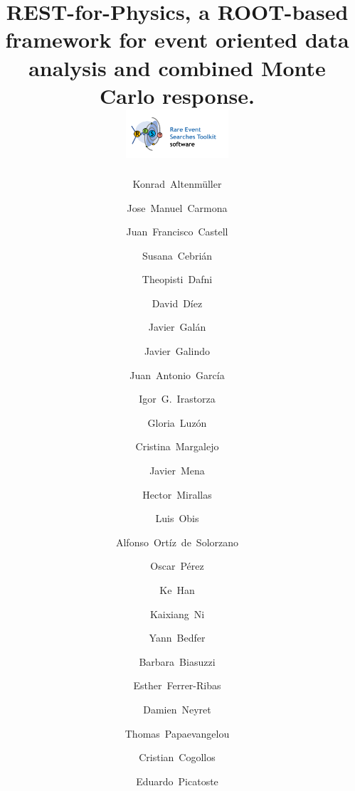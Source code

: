 \documentclass[article]{elsarticle}
\begin{document}
\begin{frontmatter}

\title{REST-for-Physics, a ROOT-based framework for event oriented data analysis and combined Monte Carlo response.\\ \includegraphics[height=18mm]{RESTlogoFull.png}}


\author{Konrad~Altenm\"uller}
\author{Jose~Manuel~Carmona}
\author{Juan~Francisco~Castell}
\author{Susana~Cebri\'an}
\author{Theopisti~Dafni}
\author{David~D\'iez}
\author{Javier~Gal\'an}
\author{Javier~Galindo}
\author{Juan~Antonio~Garc\'ia}
\author{Igor~G.~Irastorza}
\author{Gloria~Luz\'on}
\author{Cristina~Margalejo}
\author{Javier~Mena}
\author{Hector~Mirallas}
\author{Luis~Obis}
\author{Alfonso~Ort\'iz~de~Solorzano}
\author{Oscar~P\'erez}

\address{Center for Astroparticles and High Energy Physics (CAPA), Universidad de Zaragoza, 50009 Zaragoza, Spain}

\author{Ke~Han}
\author{Kaixiang~Ni}
\address{INPAC and School of Physics and Astronomy, Shanghai Jiao Tong University, Shanghai Laboratory for Particle Physics and Cosmology, Shanghai 200240, China}


\author{Yann~Bedfer}
\author{Barbara~Biasuzzi}
\author{Esther~Ferrer-Ribas}
\author{Damien~Neyret}
\author{Thomas~Papaevangelou}
\address{IRFU, CEA, Universit\'e Paris-Saclay, F-91191 Gif-sur-Yvette, France}

\author{Cristian~Cogollos}
\author{Eduardo~Picatoste}
\address{Institut de Ci\`encies del Cosmos, Universitat de Barcelona, Barcelona, Spain}
\address{Departament de F\'isica Qu\`antica i Astrof\'isica, Universitat de Barcelona, Barcelona, Spain}




\end{frontmatter}
\end{document}

